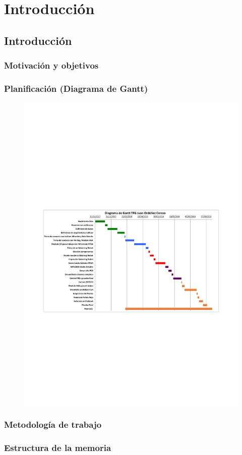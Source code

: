 \chapter{Introducción}\label{sec:intro}

\section{Introducción}
\subsection{Motivación y objetivos}
\newpage
\subsection{Planificación (Diagrama de Gantt)}
\begin{center}
	\begin{figure}[H]
		\center
		\includegraphics[trim = 15mm 85mm 0mm 100mm,clip, angle=-90, scale = 1.4]{imagenes/Introduction/Gantt.pdf}
		\label{fig:diagramaGantt}
	\end{figure}
\end{center}
\newpage

\subsection{Metodología de trabajo}
\subsection{Estructura de la memoria}